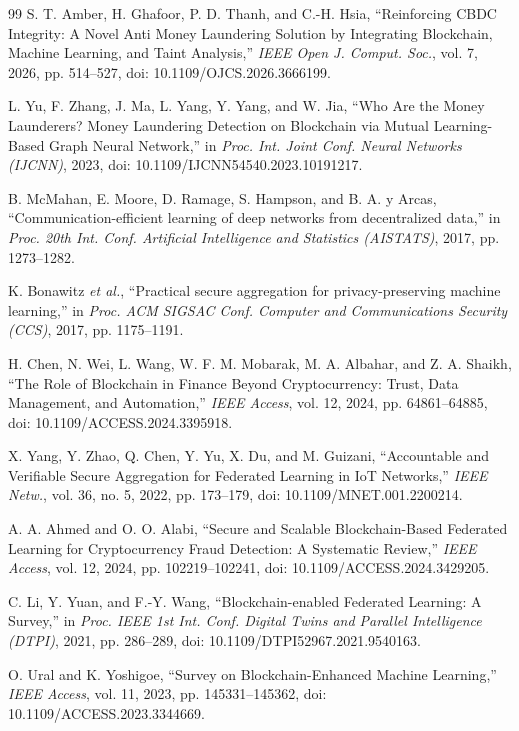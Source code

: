 \documentclass[journal]{IEEEtran}
\begin{document}
\begin{thebibliography}{99}
S. T. Amber, H. Ghafoor, P. D. Thanh, and C.-H. Hsia, ``Reinforcing CBDC Integrity: A Novel Anti Money Laundering Solution by Integrating Blockchain, Machine Learning, and Taint Analysis,'' \emph{IEEE Open J. Comput. Soc.}, vol. 7, 2026, pp. 514--527, doi: 10.1109/OJCS.2026.3666199.

L. Yu, F. Zhang, J. Ma, L. Yang, Y. Yang, and W. Jia, ``Who Are the Money Launderers? Money Laundering Detection on Blockchain via Mutual Learning-Based Graph Neural Network,'' in \emph{Proc. Int. Joint Conf. Neural Networks (IJCNN)}, 2023, doi: 10.1109/IJCNN54540.2023.10191217.

B. McMahan, E. Moore, D. Ramage, S. Hampson, and B. A. y Arcas, ``Communication-efficient learning of deep networks from decentralized data,'' in \emph{Proc. 20th Int. Conf. Artificial Intelligence and Statistics (AISTATS)}, 2017, pp. 1273--1282.

K. Bonawitz \emph{et al.}, ``Practical secure aggregation for privacy-preserving machine learning,'' in \emph{Proc. ACM SIGSAC Conf. Computer and Communications Security (CCS)}, 2017, pp. 1175--1191.

H. Chen, N. Wei, L. Wang, W. F. M. Mobarak, M. A. Albahar, and Z. A. Shaikh, ``The Role of Blockchain in Finance Beyond Cryptocurrency: Trust, Data Management, and Automation,'' \emph{IEEE Access}, vol. 12, 2024, pp. 64861--64885, doi: 10.1109/ACCESS.2024.3395918.

X. Yang, Y. Zhao, Q. Chen, Y. Yu, X. Du, and M. Guizani, ``Accountable and Verifiable Secure Aggregation for Federated Learning in IoT Networks,'' \emph{IEEE Netw.}, vol. 36, no. 5, 2022, pp. 173--179, doi: 10.1109/MNET.001.2200214.

A. A. Ahmed and O. O. Alabi, ``Secure and Scalable Blockchain-Based Federated Learning for Cryptocurrency Fraud Detection: A Systematic Review,'' \emph{IEEE Access}, vol. 12, 2024, pp. 102219--102241, doi: 10.1109/ACCESS.2024.3429205.

C. Li, Y. Yuan, and F.-Y. Wang, ``Blockchain-enabled Federated Learning: A Survey,'' in \emph{Proc. IEEE 1st Int. Conf. Digital Twins and Parallel Intelligence (DTPI)}, 2021, pp. 286--289, doi: 10.1109/DTPI52967.2021.9540163.

O. Ural and K. Yoshigoe, ``Survey on Blockchain-Enhanced Machine Learning,'' \emph{IEEE Access}, vol. 11, 2023, pp. 145331--145362, doi: 10.1109/ACCESS.2023.3344669.


\end{thebibliography}
\end{document}
